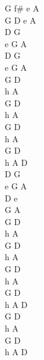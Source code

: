\begin{chord}
	G f\# e A\\
	G D e A\\
	D G\\
	e G A\\
	D G\\
	e G A\\

	G D\\
	h A\\
	G D\\
	h A\\

	G D\\
	h A\\
	G D\\
	h A D\\

	D G\\
	e G A\\
	D e\\
	G A\\

	G D\\
	h A\\
	G D\\
	h A\\

	G D\\
	h A\\
	G D\\
	h A D\\

	G D\\
	h A\\
	G D\\
	h A D
\end{chord}
